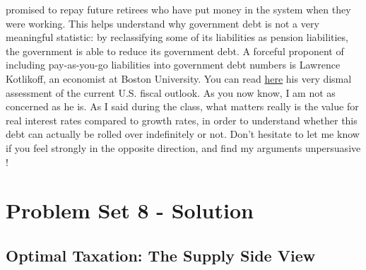 \documentclass[]{book}
\begin{document}
\begin{enumerate}
  promised to repay future retirees who have put money in the system
  when they were working. This helps understand why government debt is
  not a very meaningful statistic: by reclassifying some of its
  liabilities as pension liabilities, the government is able to reduce
  its government debt. A forceful proponent of including pay-as-you-go
  liabilities into government debt numbers is Lawrence Kotlikoff, an
  economist at Boston University. You can read
  \href{https://www.kotlikoff.net/sites/default/files/Kotlikoffbudgetcom2-25-2015.pdf}{here}
  his very dismal assessment of the current U.S. fiscal outlook. As you
  now know, I am not as concerned as he is. As I said during the class,
  what matters really is the value for real interest rates compared to
  growth rates, in order to understand whether this debt can actually be
  rolled over indefinitely or not. Don't hesitate to let me know if you
  feel strongly in the opposite direction, and find my arguments
  unpersuasive !
\end{enumerate}

\chapter{Problem Set 8 - Solution}\label{pset8-sol}

\section{Optimal Taxation: The Supply Side
View}\label{optimal-taxation-the-supply-side-view}
\end{document}

